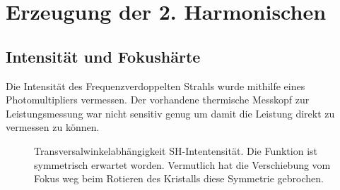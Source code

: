 \documentclass[11pt,twoside=true]{scrartcl}
\begin{document}
\section{Erzeugung der 2. Harmonischen}
\subsection{Intensität und Fokushärte}
Die Intensität des Frequenzverdoppelten Strahls wurde mithilfe eines
Photomultipliers vermessen. Der vorhandene thermische Messkopf zur Leistungsmessung
war nicht sensitiv genug um damit die Leistung direkt zu vermessen zu können.


\begin{figure}[h!]
  \begin{floatrow}
    {%
      \caption{Transversalwinkelabhängigkeit SH-Intentensität. Die Funktion
      ist symmetrisch erwartet worden. Vermutlich hat die Verschiebung vom Fokus
      weg beim Rotieren des Kristalls diese Symmetrie gebrochen. }
      \label{fig:angle_shg}
    }
  \end{floatrow}
  \end{figure}
  
\end{document}
